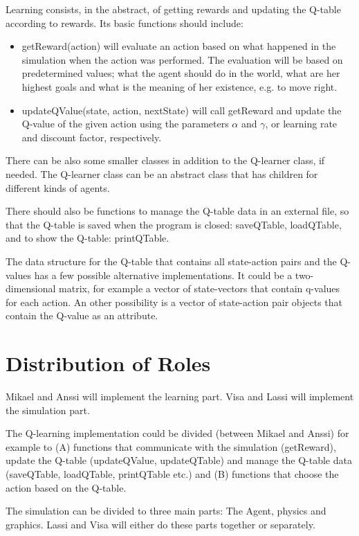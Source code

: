 \documentclass{article}
\begin{document}
Learning consists, in the abstract, of getting rewards and updating the Q-table
according to rewards. Its basic functions should include:
\begin{itemize}
  \item getReward(action) will evaluate an action based
  on what happened in the simulation when the action was performed.
  The evaluation
  will be based on predetermined values; what the agent should do in the world,
  what are her highest goals and what is the meaning of her existence, e.g. to
  move right.
  \item updateQValue(state, action, nextState) will call getReward and
  update the
  Q-value of the given action using the parameters $\alpha$ and $\gamma$,
  or learning rate and discount factor, respectively.
\end{itemize}

There can be also some smaller classes in addition to the Q-learner class,
if needed. The Q-learner class can be an abstract class that has children
for different kinds of agents.

There should also be functions to manage the Q-table data in an external file,
so that the Q-table is saved when the program is closed: saveQTable, loadQTable,
and to show the Q-table: printQTable.

The data structure for the Q-table that contains all state-action pairs
and the Q-values has a few possible alternative
implementations. It could be a two-dimensional matrix, for example a
vector of state-vectors that contain q-values for each action. An other
possibility is a vector
of state-action pair objects that contain the Q-value as an attribute.



\section{Distribution of Roles}
Mikael and Anssi will implement the learning part. Visa and Lassi will
implement the simulation part.

The Q-learning implementation could be divided (between Mikael and Anssi) for
example to (A) functions that communicate with the simulation (getReward), update
the Q-table (updateQValue, updateQTable) and manage the Q-table data (saveQTable,
loadQTable, printQTable etc.) and (B) functions that choose the action based on
the Q-table.

The simulation can be divided to three main parts: The Agent, physics and graphics.
Lassi and Visa will either do these parts together or separately.
\end{document}
